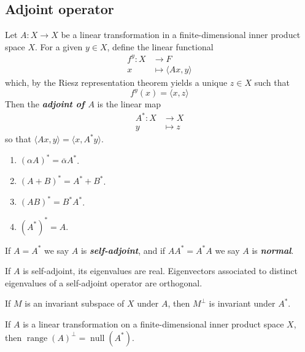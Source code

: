 \documentclass{article}
\theoremstyle{definition}
\numberwithin{equation}{section}
\begin{document}
	\subsection{Adjoint operator}
	Let $A:X\to X$ be a linear transformation in a finite-dimensional inner product space $X$. For a given $y\in X$, define the linear functional
	\begin{align*}
		f^y:X&\to F\\
		x&\mapsto\langle Ax,y\rangle
	\end{align*}
	which, by the Riesz representation theorem yields a unique $z\in X$ such that
	\[f^y(x)=\langle x,z\rangle\]
	Then the \textbf{\textit{adjoint of $A$}} is the linear map
	\begin{align*}
		A^*:X&\to X\\
		y&\mapsto z
	\end{align*}
	so that $\langle Ax,y\rangle=\langle x,A^*y\rangle$.
	\begin{prop}\leavevmode
		\begin{enumerate}
			\item $(\alpha A)^*=\overline{\alpha}A^*$.
			\item $(A+B)^*=A^*+B^*$.
			\item $(AB)^*=B^*A^*$.
			\item $(A^*)^*=A$.
		\end{enumerate}
	\end{prop}
	If $A=A^*$ we say $A$ is \textbf{\textit{self-adjoint}}, and if $AA^*=A^*A$ we say $A$ is \textbf{\textit{normal}}.
	\begin{thm}
		If $A$ is self-adjoint, its eigenvalues are real. Eigenvectors associated to distinct eigenvalues of a self-adjoint operator are orthogonal.
	\end{thm}
	\begin{thm}
		If $M$ is an invariant subspace of $X$ under $A$, then $M^\perp$ is invariant under $A^*$.
	\end{thm}
	\begin{thm}
		If $A$ is a linear transformation on a finite-dimensional inner product space $X$, then $\operatorname{range} (A)^\perp=\operatorname{null}(A^*)$.
	\end{thm}
	
\end{document}
